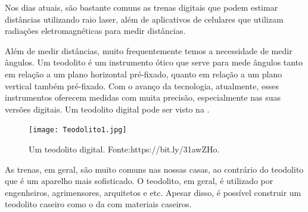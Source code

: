Nos dias atuais, são bastante comuns as trenas digitais que podem estimar distâncias utilizando raio laser, além de aplicativos de celulares que utilizam radiações eletromagnéticas para medir distâncias. 

Além de medir distâncias, muito frequentemente temos a necessidade de medir ângulos. Um teodolito é um instrumento ótico que serve para mede ângulos tanto em relação a um plano horizontal pré-fixado, quanto em relação a um plano vertical também pré-fixado. Com o avanço da tecnologia, atualmente, esses instrumentos  oferecem medidas com muita precisão, especialmente nas suas versões digitais. Um teodolito digital pode ser visto na .

\begin{figure}[H]
    \centering
    \texttt{[image: Teodolito1.jpg]}
    \caption{Um teodolito digital. Fonte:https://bit.ly/31awZHo.}
    \label{Teodolito1}
\end{figure}

As trenas, em geral, são muito comuns nas nossas casas, ao contrário do teodolito que é um aparelho mais sofisticado. O teodolito, em geral, é  utilizado por engenheiros, agrimensores, arquitetos e etc. Apesar disso, é possível construir um teodolito caseiro como o da   com materiais caseiros.

